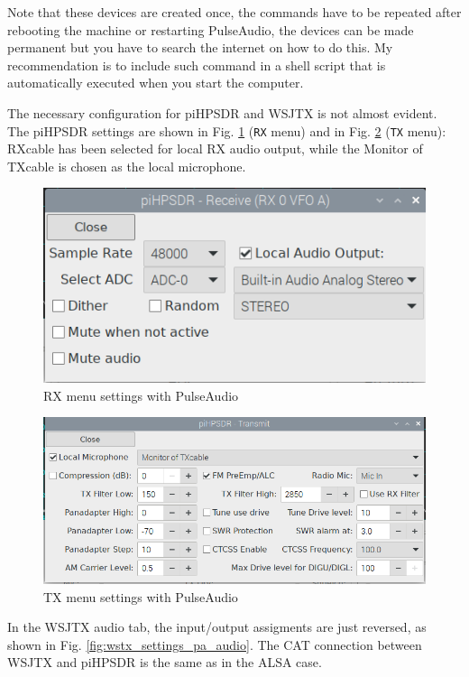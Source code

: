 \documentclass[12pt]{book}
\def\bltt#1{\texttt{\color{blue}#1}}
\begin{document}
Note that these devices are created once, the commands have to be repeated after rebooting
the machine or restarting PulseAudio, the devices can be made permanent but you have to
search the internet on how to do this. My recommendation is to include such command in a
shell script that is automatically executed when you start the computer.

The necessary configuration for piHPSDR and WSJTX is not almost evident. The
piHPSDR settings are shown in Fig. \ref{fig:rx_settings_pa_audio} (\bltt{RX} menu)
and in Fig. \ref{fig:tx_settings_pa_audio} (\bltt{TX} menu): RXcable has been selected
for local RX audio output, while the Monitor of TXcable is chosen as the local
microphone.

\begin{figure}[ht]
\center
\includegraphics[width=12cm]{rx_settings_pa_audio.png}
\caption{RX menu settings with PulseAudio}
\label{fig:rx_settings_pa_audio}
\end{figure}

\begin{figure}[ht]
\center
\includegraphics[width=12cm]{tx_settings_pa_audio.png}
\caption{TX menu settings with PulseAudio}
\label{fig:tx_settings_pa_audio}
\end{figure}

In the WSJTX audio tab, the input/output assigments are just reversed, as shown
in Fig. \ref{fig:wstx_settings_pa_audio}. The CAT connection between WSJTX and piHPSDR is
the same as in the ALSA case.
\end{document}

